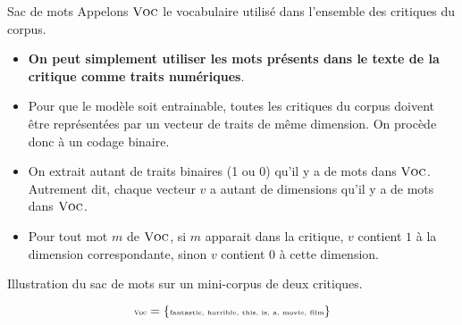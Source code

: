 \documentclass{beamer}
\begin{document}
\begin{frame}{Sac de mots}
  Appelons $\textsc{Voc}$ le vocabulaire utilis\'e dans l'ensemble des critiques du corpus.
  \begin{itemize}
  \item {\bf On peut simplement utiliser les mots pr\'esents dans le texte de la critique comme traits num\'eriques}.
  \item Pour que le mod\`ele soit entrainable, toutes les critiques du corpus doivent \^etre repr\'esent\'ees par un vecteur de traits de m\^eme dimension. On proc\`ede donc \`a un codage binaire.
  \item On extrait autant de traits binaires (1 ou 0) qu'il y a de mots dans $\textsc{Voc}$. Autrement dit, chaque vecteur $v$ a autant de dimensions qu'il y a de mots dans $\textsc{Voc}$.
  \item Pour tout mot $m$ de $\textsc{Voc}$, si $m$ apparait dans la critique, $v$ contient $1$ \`a la dimension correspondante, sinon $v$ contient $0$ \`a cette dimension.
  \end{itemize}
\end{frame}

\begin{frame}{Illustration du sac de mots sur un mini-corpus de deux critiques.}

  \begin{center}
    \[\tiny \textsc{Voc} = \{\textnormal{\tiny fantastic, horrible, this, is, a, movie, film}\}\]
  \end{center}
  

\end{frame}
\end{document}
